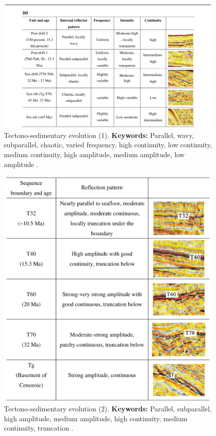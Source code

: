 \begin{figure}[h!]
    \centering
    \includegraphics[width=0.9\linewidth]{Figures/0.3Seismic/Ding2014_Carbonates_trace_1.png}
    \caption[Tectono-sedimentary evolution (1).]{Tectono-sedimentary evolution (1). \textbf{Keywords: } Parallel, wavy, subparallel, chaotic, varied frequency, high continuity, low continuity, medium continuity, high amplitude, medium amplitude, low amplitude \citep{Ding2015}.}
    \label{fig:Ding2015-1}
\end{figure}

\begin{figure}[h!]
    \centering
    \includegraphics[width=0.9\linewidth]{Figures/0.3Seismic/Ding2014_Carbonates_trace_2.png}
    \caption[Tectono-sedimentary evolution (2).]{Tectono-sedimentary evolution (2). \textbf{Keywords: } Parallel, subparallel, high amplitude, medium amplitude, high continuity, medium continuity, truncation  \citep{Ding2015}.}
    \label{fig:Ding2015-2}
\end{figure}

